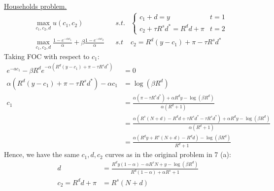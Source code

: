 \documentclass[12pt]{article}
\begin{document}
\begin{enumerate}
\begin{enumerate}
            
        \underline{Households problem.}
        \begin{align*}
            &\max_{c_1,c_2,d} u(c_1,c_2) 
            && s.t. &\begin{cases}
                c_1 + d = y & t=1 \\ c_2+ \tau R^s d^* = R^d d + \pi & t=2 
            \end{cases}
            \\ &\max_{c_1,c_2,d}   \frac{1 - e^{-\alpha c_1}}{\alpha} + \beta \frac{1 - e^{-\alpha c_2}}{\alpha}  && s.t & c_2=R^{d}\left(y-c_{1}\right)+\pi-\tau R^{s}d^{*}
        \end{align*}
        Taking FOC with respect to  $c_1$:    
        \begin{align*}
              e^{-ac_1} - \beta R^de^{-\alpha \left(R^{d}\left(y-c_{1}\right)+\pi-\tau R^{s}d^{*}\right)}   &= 0
            \\ \alpha\left(R^{d}\left(y-c_{1}\right)+\pi-\tau R^{s}d^{*}\right)-\alpha c_{1}&=\log\left(\beta R^{d}\right)
            \\ c_{1}&=\frac{\alpha\left(\pi-\tau R^{s}d^{*}\right)+\alpha R^{d}y-\log\left(\beta R^{d}\right)}{\alpha\left(R^{d}+1\right)}
            \\ &=\frac{\alpha\left(R^{s}(N+d)-R^{d}d+\tau R^{s}d^{*}-\tau R^{s}d^{*}\right)+\alpha R^{d}y-\log\left(\beta R^{d}\right)}{\alpha\left(R^{d}+1\right)}%
             \\ &= \frac{\alpha\left(R^{d}y+R^{s}(N+d)-R^{d}d\right)-\log\left(\beta R^{d}\right)}{R^{d}+1} 
        \end{align*}
        Hence, we have the same $c_1,d,c_2$ curves as in the original problem in 7 (a):
        \begin{align*}
            d  &= \frac{R^{d}y\left(1-\alpha\right)-\alpha R^{s}N+y-\log\left(\beta R^{d}\right)}{R^{d}\left(1-\alpha\right)+\alpha R^{s}+1}
            \\ c_2 = R^d d + \pi &=  R^{s}\left(N+d\right)
        \end{align*}


\end{enumerate}
\end{enumerate}
\end{document}
